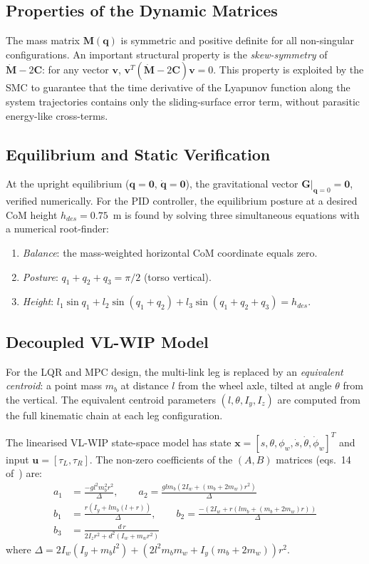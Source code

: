 \documentclass[11pt,a4paper]{article}
\newcommand{\bq}{\bm{q}}
\newcommand{\bdq}{\dot{\bm{q}}}
\newcommand{\bM}{\bm{M}}
\newcommand{\bC}{\bm{C}}
\newcommand{\bG}{\bm{G}}
\begin{document}
\subsection{Properties of the Dynamic Matrices}

The mass matrix $\bM(\bq)$ is symmetric and positive definite for all non-singular
configurations.  An important structural property is the \emph{skew-symmetry} of
$\dot{\bM} - 2\bC$: for any vector $\bm{v}$,
$\bm{v}^T(\dot{\bM} - 2\bC)\bm{v} = 0$.  This property is exploited by the SMC to
guarantee that the time derivative of the Lyapunov function along the system trajectories
contains only the sliding-surface error term, without parasitic energy-like cross-terms.

\subsection{Equilibrium and Static Verification}

At the upright equilibrium ($\bq = \bm{0}$, $\bdq = \bm{0}$), the gravitational vector
$\bG|_{\bq=0} = \bm{0}$, verified numerically.  For the PID controller, the equilibrium
posture at a desired CoM height $h_{des} = 0.75$~m is found by solving three simultaneous
equations with a numerical root-finder:
\begin{enumerate}
    \item \emph{Balance}: the mass-weighted horizontal CoM coordinate equals zero.
    \item \emph{Posture}: $q_1 + q_2 + q_3 = \pi/2$ (torso vertical).
    \item \emph{Height}: $l_1\sin q_1 + l_2\sin(q_1+q_2) + l_3\sin(q_1+q_2+q_3) = h_{des}$.
\end{enumerate}

\subsection{Decoupled VL-WIP Model}
\label{sec:vlwip}

For the LQR and MPC design, the multi-link leg is replaced by an \emph{equivalent centroid}:
a point mass $m_b$ at distance $l$ from the wheel axle, tilted at angle $\theta$ from the
vertical.  The equivalent centroid parameters $(l,\theta,I_y,I_z)$ are computed from the
full kinematic chain at each leg configuration.

The linearised VL-WIP state-space model has state
$\bm{x} = [s,\theta,\phi_w,\dot{s},\dot{\theta},\dot{\phi}_w]^T$ and input
$\bm{u} = [\tau_L,\tau_R]$.  The non-zero coefficients of the $(A,B)$ matrices
(eqs.~14 of~\cite{cui2022}) are:
\begin{align}
    a_1 &= \frac{-g l^2 m_b^2 r^2}{\Delta}, \qquad
    a_2 = \frac{g l m_b (2I_w + (m_b + 2m_w)r^2)}{\Delta} \\[4pt]
    b_1 &= \frac{r(I_y + l m_b(l+r))}{\Delta}, \qquad
    b_2 = \frac{-(2I_w + r(l m_b + (m_b + 2m_w)r))}{\Delta} \\[4pt]
    b_3 &= \frac{d\,r}{2 I_z r^2 + d^2(I_w + m_w r^2)}
\end{align}
where $\Delta = 2 I_w(I_y + m_b l^2) + (2 l^2 m_b m_w + I_y(m_b + 2m_w))r^2$.
\end{document}
